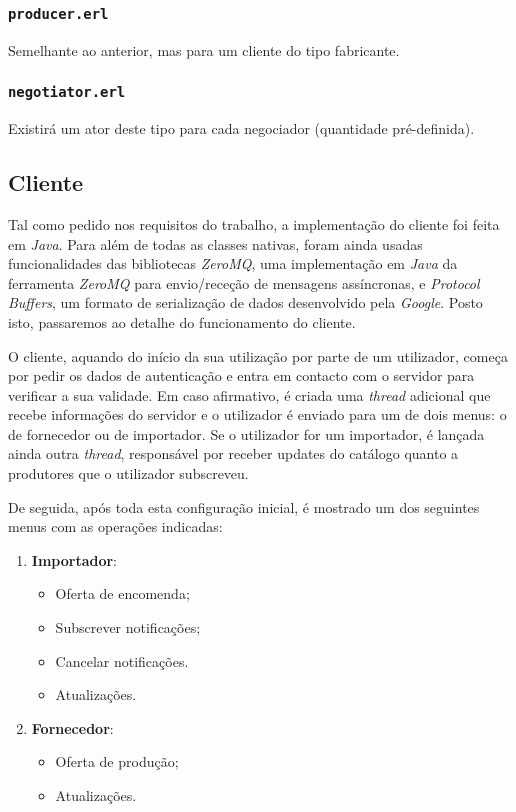 \documentclass[a4paper]{report}
\begin{document}
	\subsubsection{\texttt{producer.erl}}
	Semelhante ao anterior, mas para um cliente do tipo fabricante.

	\subsubsection{\texttt{negotiator.erl}}
	Existirá um ator deste tipo para cada negociador (quantidade pré-definida).

	\subsection{Cliente}
	Tal como pedido nos requisitos do trabalho, a implementação do cliente foi feita em \textit{Java}. Para além de todas as classes nativas, foram ainda usadas funcionalidades das bibliotecas \textit{ZeroMQ}, uma implementação em \textit{Java} da ferramenta \textit{ZeroMQ} para envio/receção de mensagens assíncronas, e \textit{Protocol Buffers}, um formato de serialização de dados desenvolvido pela \textit{Google}. Posto isto, passaremos ao detalhe do funcionamento do cliente.
	
	O cliente, aquando do início da sua utilização por parte de um utilizador, começa por pedir os dados de autenticação e entra em contacto com o servidor para verificar a sua validade. Em caso afirmativo, é criada uma \textit{thread} adicional que recebe informações do servidor e o utilizador é enviado para um de dois menus: o de fornecedor ou de importador. Se o utilizador for um importador, é lançada ainda outra \textit{thread}, responsável por receber updates do catálogo quanto a produtores que o utilizador subscreveu.
	
	De seguida, após toda esta configuração inicial, é mostrado um dos seguintes menus com as operações indicadas:
	
	\begin{enumerate}
		\item \textbf{Importador}:
		\begin{itemize}
			\item Oferta de encomenda;
			\item Subscrever notificações;
			\item Cancelar notificações.
			\item Atualizações.
		\end{itemize}

		\item \textbf{Fornecedor}:
		\begin{itemize}
			\item Oferta de produção;
			\item Atualizações.
		\end{itemize}
	\end{enumerate}
\end{document}
